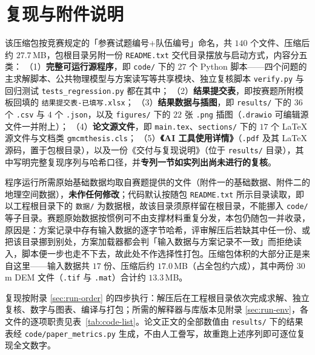 \section{复现与附件说明}

\begin{center}
	{\setlength{\fboxsep}{8pt}%
	}
\end{center}

\noindent 该压缩包按竞赛规定的「参赛试题编号+队伍编号」命名，共 $140$ 个文件、压缩后约 $27.7$\,MB，包根目录另附一份 \texttt{README.txt} 交代目录摆放与启动方式，内容分五类：
（1）\textbf{完整可运行源程序}，即 \texttt{code/} 下的 $27$ 个 Python 脚本——四个问题的主求解脚本、公共物理模型与方案读写等共享模块、独立复核脚本 \texttt{verify.py} 与回归测试 \texttt{tests\_regression.py} 都在其中；
（2）\textbf{结果提交表}，即按赛题所附模板回填的 \texttt{结果提交表-已填写.xlsx}；
（3）\textbf{结果数据与插图}，即 \texttt{results/} 下的 $36$ 个 \texttt{.csv} 与 $4$ 个 \texttt{.json}，以及 \texttt{figures/} 下的 $22$ 张 \texttt{.png} 插图（\texttt{.drawio} 可编辑源文件一并附上）；
（4）\textbf{论文源文件}，即 \texttt{main.tex}、\texttt{sections/} 下的 $17$ 个 \LaTeX{} 源文件与文档类 \texttt{gmcmthesis.cls}；
（5）\textbf{《AI 工具使用详情》}（\texttt{.pdf} 及其 \LaTeX{} 源码，置于包根目录），以及一份《交付与复现说明》（位于 \texttt{results/} 目录），其中写明完整复现序列与哈希口径，并\textbf{专列一节如实列出尚未进行的复核}。

\noindent 程序运行所需原始基础数据均取自赛题提供的文件（附件一的基础数据、附件二的地理空间数据），\textbf{未作任何修改}；代码默认按随包 \texttt{README.txt} 所示目录读取，即以工程根目录下的 \texttt{数据/} 为数据根，故该目录须原样留在根目录，不能挪入 \texttt{code/} 等子目录。赛题原始数据按惯例可不由支撑材料重复分发，本包仍随包一并收录，原因是：方案记录中存有输入数据的逐字节哈希，评审解压后若缺其中任一份、或把该目录挪到别处，方案加载器都会判「输入数据与方案记录不一致」而拒绝读入，脚本便一步也走不下去，故此处不作选择性打包。压缩包体积的大部分正是来自这里——输入数据共 $17$ 份、压缩后约 $17.0$\,MB（占全包约六成），其中两份 $30$\,m DEM 文件（\texttt{.tif} 与 \texttt{.mat}）合计约 $13.3$\,MB。

\noindent 复现按附录 \ref{sec:run-order} 的四步执行：解压后在工程根目录依次完成求解、独立复核、数字与图表、编译与打包；所需的解释器与库版本见附录 \ref{sec:run-env}，各文件的逐项职责见表~\ref{tab:code-list}。论文正文的全部数值由 \texttt{results/} 下的结果表经 \texttt{code/paper\_metrics.py} 生成，不由人工誊写，故重跑上述序列即可逐位复现全文数字。
